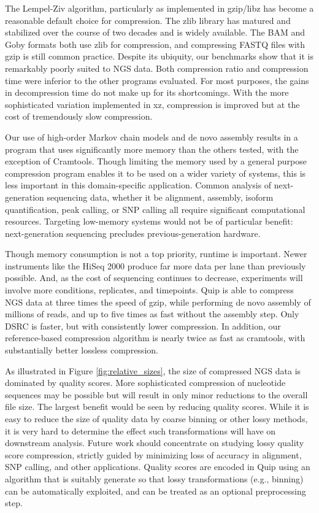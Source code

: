 \documentclass[a4,center,fleqn]{NAR}
\begin{document}
The Lempel-Ziv algorithm, particularly as implemented in gzip/libz has become
a reasonable default choice for compression. The zlib library has matured and
stabilized over the course of two decades and is widely available. The BAM and
Goby formats both use zlib for compression, and compressing FASTQ files with
gzip is still common practice. Despite its ubiquity, our benchmarks show that
it is remarkably poorly suited to NGS data. Both compression ratio and
compression time were inferior to the other programs evaluated. For most
purposes, the gains in decompression time do not make up for its shortcomings.
With the more sophisticated variation implemented in xz, compression is improved
but at the cost of tremendously slow compression.

Our use of high-order Markov chain models and de novo assembly results in a
program that uses significantly more memory than the others tested, with the
exception of Cramtools. Though limiting the memory used by a general purpose
compression program enables it to be used on a wider variety of systems, this
is less important in this domain-specific application. Common analysis of
next-generation sequencing data, whether it be alignment, assembly, isoform
quantification, peak calling, or SNP calling all require significant
computational resources. Targeting low-memory systems would not be of
particular benefit: next-generation sequencing precludes previous-generation
hardware.

Though memory consumption is not a top priority, runtime is important. Newer
instruments like the HiSeq 2000 produce far more data per lane than previously
possible. And, as the cost of sequencing continues to decrease, experiments
will involve more conditions, replicates, and timepoints.  Quip is able to
compress NGS data at three times the speed of gzip, while performing de novo
assembly of millions of reads, and up to five times as fast without the
assembly step. Only DSRC is faster, but with consistently lower compression.
In addition, our reference-based compression algorithm is nearly twice as fast
as cramtools, with substantially better lossless compression.

As illustrated in Figure \ref{fig:relative_sizes}, the size of compressed NGS
data is dominated by quality scores. More sophisticated compression of
nucleotide sequences may be possible but will result in only minor reductions
to the overall file size. The largest benefit would be seen by reducing
quality scores. While it is easy to reduce the size of quality data by coarse
binning or other lossy methods, it is very hard to determine the effect such
transformations will have on downstream analysis. Future work should
concentrate on studying lossy quality score compression, strictly guided by
minimizing loss of accuracy in alignment, SNP calling, and other applications.
Quality scores are encoded in Quip using an algorithm that is suitably
generate so that lossy transformations (e.g., binning) can be automatically
exploited, and can be treated as an optional preprocessing step.
\end{document}
